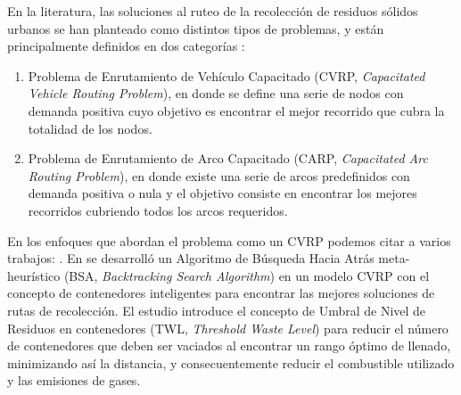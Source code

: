 
En la literatura, las soluciones al ruteo de la recolección de residuos sólidos urbanos se han planteado como distintos tipos de problemas, y están principalmente definidos en dos categorías \citep{Tirkolaee2018ATime}:

\begin{enumerate}[label=\alph*)]
    \item Problema de Enrutamiento de Vehículo Capacitado (CVRP, \textit{Capacitated Vehicle Routing Problem}), en donde se define una serie de nodos con demanda positiva cuyo objetivo es encontrar el mejor recorrido que cubra la totalidad de los nodos.
    \item Problema de Enrutamiento de Arco Capacitado (CARP, \textit{Capacitated Arc Routing Problem}), en donde existe una serie de arcos predefinidos con demanda positiva o nula y el objetivo consiste en encontrar los mejores recorridos cubriendo todos los arcos requeridos.
\end{enumerate}

En los enfoques que abordan el problema como un CVRP podemos citar a varios trabajos: \citet{Akhtar2017BacktrackingOptimization,Ombuki-Berman2007WASTEALGORITHMS,Kim2006WasteWindows,Billa2014GISOptimization,Karadimas2007OptimalAlgorithm}. En \citet{Akhtar2017BacktrackingOptimization} se desarrolló un Algoritmo de Búsqueda Hacia Atrás meta-heurístico (BSA, \textit{Backtracking Search Algorithm}) en un modelo CVRP con el concepto de contenedores inteligentes para encontrar las mejores soluciones de rutas de recolección. El estudio introduce el concepto de Umbral de Nivel de Residuos en contenedores (TWL, \textit{Threshold Waste Level}) para reducir el número de contenedores que deben ser vaciados al encontrar un rango óptimo de llenado, minimizando así la distancia, y consecuentemente reducir el combustible utilizado y las emisiones de gases.

